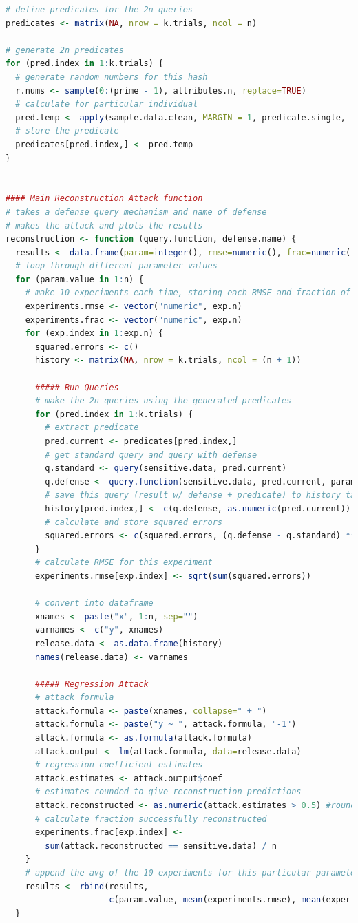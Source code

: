 \documentclass[12pt]{article}
\begin{document}
\begin{lstlisting}[language=R]
# define predicates for the 2n queries
predicates <- matrix(NA, nrow = k.trials, ncol = n)

# generate 2n predicates
for (pred.index in 1:k.trials) {
  # generate random numbers for this hash
  r.nums <- sample(0:(prime - 1), attributes.n, replace=TRUE)
  # calculate for particular individual
  pred.temp <- apply(sample.data.clean, MARGIN = 1, predicate.single, r.nums)
  # store the predicate
  predicates[pred.index,] <- pred.temp
}


#### Main Reconstruction Attack function
# takes a defense query mechanism and name of defense
# makes the attack and plots the results
reconstruction <- function (query.function, defense.name) {
  results <- data.frame(param=integer(), rmse=numeric(), frac=numeric())
  # loop through different parameter values
  for (param.value in 1:n) {
    # make 10 experiments each time, storing each RMSE and fraction of success
    experiments.rmse <- vector("numeric", exp.n)
    experiments.frac <- vector("numeric", exp.n)
    for (exp.index in 1:exp.n) {
      squared.errors <- c()
      history <- matrix(NA, nrow = k.trials, ncol = (n + 1))
      
      ##### Run Queries
      # make the 2n queries using the generated predicates
      for (pred.index in 1:k.trials) {
        # extract predicate
        pred.current <- predicates[pred.index,]
        # get standard query and query with defense
        q.standard <- query(sensitive.data, pred.current)
        q.defense <- query.function(sensitive.data, pred.current, param.value)
        # save this query (result w/ defense + predicate) to history table
        history[pred.index,] <- c(q.defense, as.numeric(pred.current))
        # calculate and store squared errors
        squared.errors <- c(squared.errors, (q.defense - q.standard) ** 2)
      }
      # calculate RMSE for this experiment
      experiments.rmse[exp.index] <- sqrt(sum(squared.errors))
      
      # convert into dataframe
      xnames <- paste("x", 1:n, sep="")
      varnames <- c("y", xnames)
      release.data <- as.data.frame(history)
      names(release.data) <- varnames
      
      ##### Regression Attack
      # attack formula
      attack.formula <- paste(xnames, collapse=" + ")
      attack.formula <- paste("y ~ ", attack.formula, "-1")
      attack.formula <- as.formula(attack.formula)
      attack.output <- lm(attack.formula, data=release.data)
      # regression coefficient estimates
      attack.estimates <- attack.output$coef
      # estimates rounded to give reconstruction predictions
      attack.reconstructed <- as.numeric(attack.estimates > 0.5) #round(attack.estimates)
      # calculate fraction successfully reconstructed
      experiments.frac[exp.index] <-
        sum(attack.reconstructed == sensitive.data) / n
    }
    # append the avg of the 10 experiments for this particular parameter value
    results <- rbind(results,
                     c(param.value, mean(experiments.rmse), mean(experiments.frac)))
  }
  

\end{lstlisting}
\end{document}
